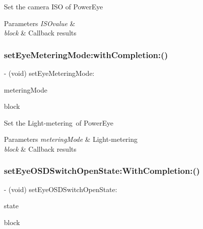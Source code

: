 Set the camera I\+SO of Power\+Eye


\begin{DoxyParams}{Parameters}
{\em I\+S\+Ovalue} & \\
\hline
{\em block} & Callback results \\
\hline
\end{DoxyParams}
\mbox{\label{interface_p_v_camera_ada976a84eb9c6b7e567e2ea213642d1f}} 
\subsubsection{\texorpdfstring{set\+Eye\+Metering\+Mode\+:with\+Completion\+:()}{setEyeMeteringMode:withCompletion:()}}
{\footnotesize\ttfamily -\/ (void) set\+Eye\+Metering\+Mode\+: \begin{DoxyParamCaption}\item[{(P\+V\+Eye\+Camera\+Metering\+Mode)}]{metering\+Mode }\item[{withCompletion:(P\+V\+Completion\+Block)}]{block }\end{DoxyParamCaption}}

Set the Light-\/metering of Power\+Eye


\begin{DoxyParams}{Parameters}
{\em metering\+Mode} & Light-\/metering \\
\hline
{\em block} & Callback results \\
\hline
\end{DoxyParams}
\mbox{\label{interface_p_v_camera_a195b2a1c7389abf1b15364ccd040e87b}} 
\subsubsection{\texorpdfstring{set\+Eye\+O\+S\+D\+Switch\+Open\+State\+:\+With\+Completion\+:()}{setEyeOSDSwitchOpenState:WithCompletion:()}}
{\footnotesize\ttfamily -\/ (void) set\+Eye\+O\+S\+D\+Switch\+Open\+State\+: \begin{DoxyParamCaption}\item[{(P\+V\+Eye\+O\+S\+D\+Switch\+State)}]{state }\item[{WithCompletion:(P\+V\+Completion\+Block)}]{block }\end{DoxyParamCaption}}

